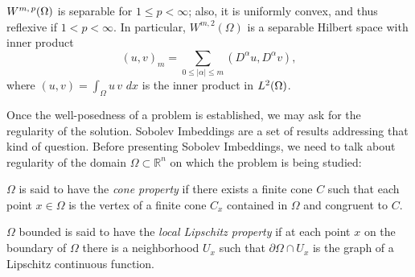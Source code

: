 \begin{theorem}${W^{m,\,p}(\Omega)}$ is separable for $1\leq p < \infty$; also, it is uniformly convex, and thus reflexive if $1<p<\infty$. In particular, $W^{m,2}(\Omega)$ is a separable Hilbert space with inner product
$$(u,v)_m=\sum_{0\leq|\alpha|\leq m}\left(D^\alpha u,D^\alpha v\right),$$
where $(u,v)=\int_\Omega u\,v\,\,dx$ is the inner product in ${L^{2}(\Omega)}$.
\end{theorem}
Once the well-posedness of a problem is established, we may ask for the regularity of the solution. Sobolev Imbeddings are a set of results addressing that kind of question. Before presenting Sobolev Imbeddings, we need to talk about regularity of the domain $\Omega\subset \mathbb{R}^n$ on which the problem is being studied:
\begin{definition}
$\Omega$ is said to have the \emph{cone property} if there exists a finite cone $C$ such that each point $x\in \Omega$ is the vertex of a finite cone $C_x$ contained in $\Omega$ and congruent to $C$.
\end{definition}
\begin{definition}\label{def:local_lipschitz}
$\Omega$ bounded is said to have the \emph{local Lipschitz property} if at each point $x$ on the boundary of $\Omega$ there is a neighborhood $U_x$ such that $\partial \Omega \cap U_x$ is the graph of a Lipschitz continuous function.
\end{definition}

